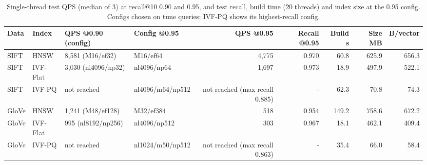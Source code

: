 \begin{table}[!t]
\centering
\footnotesize
\begin{adjustbox}{max width=\linewidth}
\begin{tabular}{llllrrrrr}
\toprule
Data & Index & QPS @0.90 (config) & Config @0.95 & QPS @0.95 & Recall @0.95 & Build s & Size MB & B/vector \\
\midrule
SIFT & HNSW & 8,581 (M16/ef32) & M16/ef64 & 4,775 & 0.970 & 60.8 & 625.9 & 656.3 \\
SIFT & IVF-Flat & 3,030 (nl4096/np32) & nl4096/np64 & 1,697 & 0.973 & 18.9 & 497.9 & 522.1 \\
SIFT & IVF-PQ & not reached & nl4096/m64/np512 & not reached (max recall 0.885) & - & 62.3 & 70.8 & 74.3 \\
GloVe & HNSW & 1,241 (M48/ef128) & M32/ef384 & 518 & 0.954 & 149.2 & 758.6 & 672.2 \\
GloVe & IVF-Flat & 995 (nl8192/np256) & nl4096/np512 & 303 & 0.967 & 18.1 & 462.1 & 409.4 \\
GloVe & IVF-PQ & not reached & nl1024/m50/np512 & not reached (max recall 0.863) & - & 35.4 & 66.0 & 58.4 \\
\bottomrule
\end{tabular}
\end{adjustbox}
\caption{Single-thread test QPS (median of 3) at recall@10 0.90 and 0.95, and test recall, build time (20 threads) and index size at the 0.95 config. Configs chosen on tune queries; IVF-PQ shows its highest-recall config.}
\label{tab:part2c}
\end{table}
